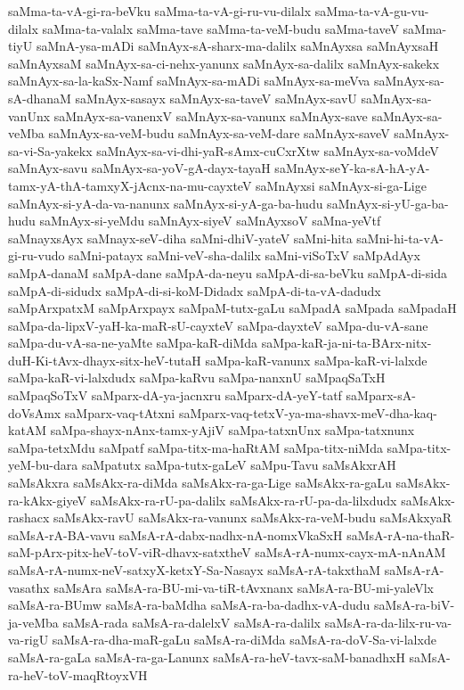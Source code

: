 {saMma-ta-vA-gi-ra-beVku
saMma-ta-vA-gi-ru-vu-dilalx
saMma-ta-vA-gu-vu-dilalx
saMma-ta-valalx
saMma-tave
saMma-ta-veM-budu
saMma-taveV
saMma-tiyU
saMnA-ysa-mADi
saMnAyx-sA-sharx-ma-dalilx
saMnAyxsa
saMnAyxsaH
saMnAyxsaM
saMnAyx-sa-ci-nehx-yanunx
saMnAyx-sa-dalilx
saMnAyx-sakekx
saMnAyx-sa-la-kaSx-Namf
saMnAyx-sa-mADi
saMnAyx-sa-meVva
saMnAyx-sa-sA-dhanaM
saMnAyx-sasayx
saMnAyx-sa-taveV
saMnAyx-savU
saMnAyx-sa-vanUnx
saMnAyx-sa-vanenxV
saMnAyx-sa-vanunx
saMnAyx-save
saMnAyx-sa-veMba
saMnAyx-sa-veM-budu
saMnAyx-sa-veM-dare
saMnAyx-saveV
saMnAyx-sa-vi-Sa-yakekx
saMnAyx-sa-vi-dhi-yaR-sAmx-cuCxrXtw
saMnAyx-sa-voMdeV
saMnAyx-savu
saMnAyx-sa-yoV-gA-dayx-tayaH
saMnAyx-seY-ka-sA-hA-yA-tamx-yA-thA-tamxyX-jAcnx-na-mu-cayxteV
saMnAyxsi
saMnAyx-si-ga-Lige
saMnAyx-si-yA-da-va-nanunx
saMnAyx-si-yA-ga-ba-hudu
saMnAyx-si-yU-ga-ba-hudu
saMnAyx-si-yeMdu
saMnAyx-siyeV
saMnAyxsoV
saMna-yeVtf
saMnayxsAyx
saMnayx-seV-diha
saMni-dhiV-yateV
saMni-hita
saMni-hi-ta-vA-gi-ru-vudo
saMni-patayx
saMni-veV-sha-dalilx
saMni-viSoTxV
saMpAdAyx
saMpA-danaM
saMpA-dane
saMpA-da-neyu
saMpA-di-sa-beVku
saMpA-di-sida
saMpA-di-sidudx
saMpA-di-si-koM-Didadx
saMpA-di-ta-vA-dadudx
saMpArxpatxM
saMpArxpayx
saMpaM-tutx-gaLu
saMpadA
saMpada
saMpadaH
saMpa-da-lipxV-yaH-ka-maR-sU-cayxteV
saMpa-dayxteV
saMpa-du-vA-sane
saMpa-du-vA-sa-ne-yaMte
saMpa-kaR-diMda
saMpa-kaR-ja-ni-ta-BArx-nitx-duH-Ki-tAvx-dhayx-sitx-heV-tutaH
saMpa-kaR-vanunx
saMpa-kaR-vi-lalxde
saMpa-kaR-vi-lalxdudx
saMpa-kaRvu
saMpa-nanxnU
saMpaqSaTxH
saMpaqSoTxV
saMparx-dA-ya-jacnxru
saMparx-dA-yeY-tatf
saMparx-sA-doVsAmx
saMparx-vaq-tAtxni
saMparx-vaq-tetxV-ya-ma-shavx-meV-dha-kaq-katAM
saMpa-shayx-nAnx-tamx-yAjiV
saMpa-tatxnUnx
saMpa-tatxnunx
saMpa-tetxMdu
saMpatf
saMpa-titx-ma-haRtAM
saMpa-titx-niMda
saMpa-titx-yeM-bu-dara
saMpatutx
saMpa-tutx-gaLeV
saMpu-Tavu
saMsAkxrAH
saMsAkxra
saMsAkx-ra-diMda
saMsAkx-ra-ga-Lige
saMsAkx-ra-gaLu
saMsAkx-ra-kAkx-giyeV
saMsAkx-ra-rU-pa-dalilx
saMsAkx-ra-rU-pa-da-lilxdudx
saMsAkx-rashacx
saMsAkx-ravU
saMsAkx-ra-vanunx
saMsAkx-ra-veM-budu
saMsAkxyaR
saMsA-rA-BA-vavu
saMsA-rA-dabx-nadhx-nA-nomxVkaSxH
saMsA-rA-na-thaR-saM-pArx-pitx-heV-toV-viR-dhavx-satxtheV
saMsA-rA-numx-cayx-mA-nAnAM
saMsA-rA-numx-neV-satxyX-ketxY-Sa-Nasayx
saMsA-rA-takxthaM
saMsA-rA-vasathx
saMsAra
saMsA-ra-BU-mi-va-tiR-tAvxnanx
saMsA-ra-BU-mi-yaleVlx
saMsA-ra-BUmw
saMsA-ra-baMdha
saMsA-ra-ba-dadhx-vA-dudu
saMsA-ra-biV-ja-veMba
saMsA-rada
saMsA-ra-dalelxV
saMsA-ra-dalilx
saMsA-ra-da-lilx-ru-va-va-rigU
saMsA-ra-dha-maR-gaLu
saMsA-ra-diMda
saMsA-ra-doV-Sa-vi-lalxde
saMsA-ra-gaLa
saMsA-ra-ga-Lanunx
saMsA-ra-heV-tavx-saM-banadhxH
saMsA-ra-heV-toV-maqRtoyxVH
}
